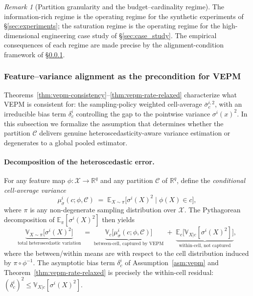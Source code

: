 \documentclass[12pt]{article}
\theoremstyle{plain}
\theoremstyle{definition}
\theoremstyle{remark}
\newtheorem{remark}{Remark}[section]
\begin{document}
\begin{remark}[Partition granularity and the budget--cardinality regime]
The information-rich regime is the operating regime for the synthetic experiments of \S\ref{sec:experiments}; the saturation regime is the operating regime for the high-dimensional engineering case study of \S\ref{sec:case_study}.  The empirical consequences of each regime are made precise by the alignment-condition framework of \S\ref{subsec:alignment}.
\end{remark}


\subsubsection{Feature--variance alignment as the precondition for VEPM}
\label{subsec:alignment}

Theorems~\ref{thm:vepm-consistency}--\ref{thm:vepm-rate-relaxed}
characterize what VEPM is consistent for: the sampling-policy weighted
cell-average $\bar{\sigma}_c^{i,2}$, with an irreducible bias term
$\delta_c^i$ controlling the gap to the pointwise variance
$\sigma^i(x)^2$.  In this subsection we formalize the assumption that
determines whether the partition $\mathcal{C}$ delivers genuine
heteroscedasticity-aware variance estimation or degenerates to a global
pooled estimator.

\paragraph{Decomposition of the heteroscedastic error.}
For any feature map $\phi:\mathcal{X}\to\mathbb{R}^q$ and any partition
$\mathcal{C}$ of $\mathbb{R}^q$, define the \emph{conditional cell-average
variance}
\begin{equation}\label{eq:cell-mean}
  \mu_\sigma^{i}(c;\phi,\mathcal{C})
    \;=\;
    \mathbb{E}_{X\sim\pi}\bigl[\sigma^{i}(X)^{2}\;\big|\;\phi(X)\in c\bigr],
\end{equation}
where $\pi$ is any non-degenerate sampling distribution over
$\mathcal{X}$.  The Pythagorean decomposition of
$\mathbb{E}_\pi[\sigma^{i}(X)^{2}]$ then yields
\begin{equation}\label{eq:alignment-decomp}
  \underbrace{\mathbb{V}_{X\sim\pi}\!\bigl[\sigma^{i}(X)^{2}\bigr]}_{
    \text{total heteroscedastic variation}}
  \;=\;
  \underbrace{\mathbb{V}_{c}\!\bigl[\mu_\sigma^{i}(c;\phi,\mathcal{C})\bigr]}_{
    \text{between-cell, captured by VEPM}}
  \;+\;
  \underbrace{\mathbb{E}_{c}\!\bigl[\mathbb{V}_{X|c}[\sigma^{i}(X)^{2}]\bigr]}_{
    \text{within-cell, not captured}},
\end{equation}
where the between/within means are with respect to the cell distribution
induced by $\pi\circ\phi^{-1}$.  The asymptotic bias term $\delta_c^i$ of
Assumption~\ref{asm:vepm} and
Theorem~\ref{thm:vepm-rate-relaxed} is precisely the within-cell
residual: $(\delta_c^i)^2 \le \mathbb{V}_{X|c}[\sigma^{i}(X)^{2}]$.
\end{document}

